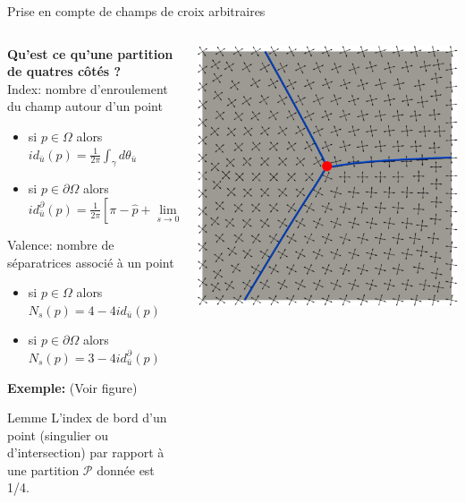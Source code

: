 \documentclass[compress,10pt,aspectratio=169]{beamer}
\begin{document}
\begin{frame}{Prise en compte de champs de croix arbitraires}%
\small
\vspace{-0.2cm}
  \begin{columns}
    \begin{column}{0.7\textwidth}
{\bf Qu'est ce qu'une partition de quatres côtés ?}\\\vspace{0.2cm}
    {\color{onera} Index:} nombre d'enroulement du champ autour d'un point
\begin{itemize}
    \item si $p\in\Omega$ alors $id_{\bar{u}}(p) = \frac{1}{2\pi}\int_\gamma d\theta_{\bar{u}}$
    \item si $p\in\partial\Omega$ alors $id^\partial_{\bar{u}}(p)=\frac{1}{2\pi}\left[\pi-\hat{p}+\lim\limits_{s\rightarrow 0}\int_s^{1-s}d\theta_{\bar{u}}^\gamma\right]$
\end{itemize}
{\color{onera} Valence:} nombre de séparatrices associé à un point
\begin{itemize}
    \item si $p\in\Omega$ alors $N_s(p) = 4-4id_{\bar{u}}(p)$
    \item si $p\in\partial\Omega$ alors $N_s(p) = 3-4id^\partial_{\bar{u}}(p)$
\end{itemize}
{\bf Exemple:} (Voir figure)\\\vspace{0.1cm}
\begin{onerablock}{\small  Lemme}
    \small L'index de bord d'un point (singulier ou d'intersection) par rapport à une partition $\mathcal{P}$ donnée est 1/4.
\end{onerablock}
    \end{column}
    \begin{column}{0.3\textwidth}
        \centering
  \includegraphics[scale=0.1]{images/sepa_3.pdf}

\end{column}
\end{columns}
\end{frame}
\end{document}
